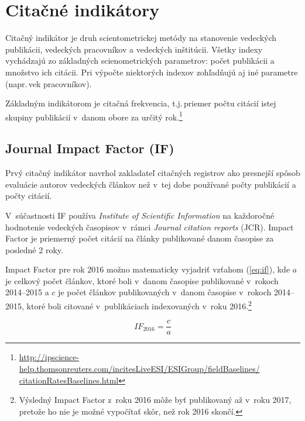 
\section{Citačné indikátory}
\label{sec:citation.indicators}

Citačný indikátor je druh scientometrickej metódy na stanovenie 
vedeckých publikácii, vedeckých pracovníkov a vedeckých inštitúcii.  Všetky
indexy vychádzajú zo základných scienometrických parametrov: počet publikácii a
množstvo ich citácii.  Pri výpočte niektorých indexov zohľadňujú aj iné
parametre (napr.\,vek pracovníkov).

Základným indikátorom je citačná frekvencia, t.j.\,priemer počtu citácií istej
skupiny publikácií v~danom obore za určitý
rok.\footnote{\url{http://ipscience-help.thomsonreuters.com/incitesLiveESI/ESIGroup/fieldBaselines/
    citationRatesBaselines.html}}


\subsection{Journal Impact Factor (IF)}

Prvý citačný indikátor navrhol zakladateľ citačných registrov
\citet{Garflield1955} ako presnejší spôsob evaluácie autorov vedeckých článkov
než v~tej dobe používané počty publikácií a počty citácií.

V~súčastnosti IF používa \emph{Institute of Scientific Information} na
každoročné hodnotenie vedeckých časopisov v~rámci \emph{Journal citation
  reports} (JCR).  Impact Factor je priemerný počet citácií na články
publikované danom časopise za posledné 2 roky.

Impact Factor pre rok 2016 možno matematicky vyjadriť vzťahom (\ref{eq:if}), kde
$a$ je celkový počet článkov, ktoré boli v~danom časopise publikované v~rokoch
2014--2015 a $c$ je počet článkov publikovaných v~danom časopise v~rokoch
2014--2015, ktoré boli citované v~publikáciach indexovaných v~roku
2016.\footnote{Výsledný Impact Factor z~roku 2016 môže byť publikovaný až v~roku
  2017, pretože ho nie je možné vypočítať skôr, než rok 2016 skončí.}

\begin{equation}
\label{eq:if}
\mathit{IF}_{2016} = \frac{c}{a}
\end{equation}

